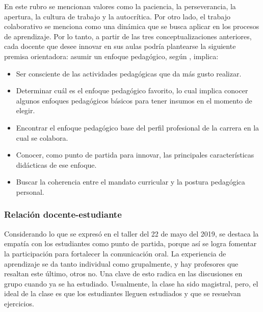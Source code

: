 En este rubro se mencionan valores como la paciencia, la perseverancia, la apertura, la cultura de trabajo y la autocrítica. Por otro lado, el trabajo colaborativo se menciona como una dinámica que se busca aplicar en los procesos de aprendizaje.  Por lo tanto, a partir de las tres conceptualizaciones anteriores, cada docente que desee innovar en sus aulas podría plantearse la siguiente premisa orientadora: asumir un enfoque pedagógico, según \cite{Gonzalez2014}, implica: 

\begin{itemize}
    
    \color{blue} \item \color{black} Ser consciente de las actividades pedagógicas que da más gusto realizar.

     \color{blue} \item \color{black} Determinar cuál es el enfoque pedagógico favorito, lo cual implica conocer algunos enfoques pedagógicos básicos para tener insumos en el momento de elegir.
     
    \color{blue} \item \color{black} Encontrar el enfoque pedagógico base del perfil profesional de la carrera en la cual se colabora.
    
    \color{blue} \item \color{black} Conocer, como punto de partida para innovar, las principales características didácticas de ese enfoque. 
    
    \color{blue} \item \color{black} Buscar la coherencia entre el mandato curricular y la postura pedagógica personal. 
    \end{itemize}

\subsubsection*{Relación docente-estudiante}

Considerando lo que se expresó en el taller del 22 de mayo del 2019, se destaca la empatía con los estudiantes como punto de partida, porque así se logra fomentar la participación para fortalecer la comunicación oral. La experiencia de aprendizaje se da tanto individual como grupalmente, y hay profesores que resaltan este último, otros no. Una clave de esto radica en las discusiones en grupo cuando ya se ha estudiado. Usualmente, la clase ha sido magistral, pero, el ideal de la clase es que los estudiantes lleguen estudiados y que se resuelvan ejercicios. 


